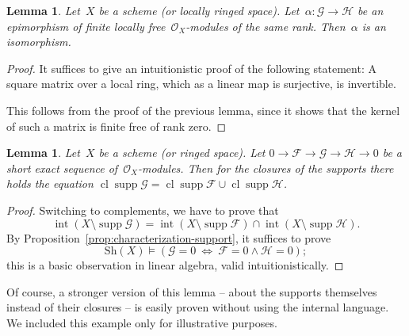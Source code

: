 \documentclass[10pt]{amsart}
\theoremstyle{definition}
\theoremstyle{plain}
\newtheorem{lemma}[defn]{Lemma}
\theoremstyle{remark}
\newcommand{\F}{\mathcal{F}}
\renewcommand{\G}{\mathcal{G}}
\renewcommand{\H}{\mathcal{H}}
\renewcommand{\O}{\mathcal{O}}
\newcommand{\Sh}{\mathrm{Sh}}
\DeclareMathOperator{\Int}{int}
\DeclareMathOperator{\Clos}{cl}
\DeclareMathOperator{\supp}{supp}
\newcommand{\?}{\,{:}\,}
\renewcommand{\_}{\mathpunct{.}\,}
\begin{document}
\begin{lemma}Let~$X$ be a scheme (or locally ringed space). Let~$\alpha : \G
\to \H$ be an epimorphism of finite locally free~$\O_X$-modules of the same
rank. Then~$\alpha$ is an isomorphism.\end{lemma}
\begin{proof}It suffices to give an intuitionistic proof of the following
statement: A square matrix over a local ring, which as a linear map is
surjective, is invertible.

This follows from the proof of the previous lemma, since it shows that the
kernel of such a matrix is finite free of rank zero.
\end{proof}

\begin{lemma}Let~$X$ be a scheme (or ringed space). Let
$0 \to \F \to \G \to \H \to 0$ be a short exact sequence of~$\O_X$-modules.
Then for the closures of the supports there holds the equation
$\Clos \supp \G = \Clos \supp \F \cup \Clos \supp \H$.
\end{lemma}
\begin{proof}Switching to complements, we have to prove that
\[ \Int(X \setminus \supp\G) = \Int(X \setminus \supp\F) \cap \Int(X \setminus
\supp\H). \]
By Proposition~\ref{prop:characterization-support}, it suffices to prove
\[ \Sh(X) \models (\G = 0\ \Longleftrightarrow\ \F = 0 \wedge \H = 0); \]
this is a basic observation in linear algebra, valid intuitionistically.
\end{proof}
Of course, a stronger version of this lemma -- about the supports themselves
instead of their closures -- is easily proven without using the internal
language. We included this example only for illustrative purposes.
\end{document}
